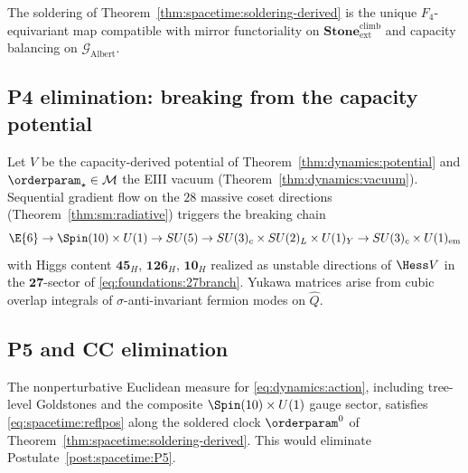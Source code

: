 \begin{conjecture}
\label{conj:spacetime:soldering-unique}
The soldering of Theorem~\ref{thm:spacetime:soldering-derived} is the unique
$F_4$-equivariant map compatible with mirror functoriality on
$\mathbf{Stone}^{\mathrm{climb}}_{\mathrm{ext}}$ and capacity balancing on
$\mathcal{G}_{\mathrm{Albert}}$.
\end{conjecture}

\subsection{P4 elimination: breaking from the capacity potential}
\label{sec:axiomatic:p4}

\begin{conjecture}
\label{conj:sm:breaking-derived}
Let $V$ be the capacity-derived potential of Theorem~\ref{thm:dynamics:potential}
and $\orderparam_\star\in\mathcal{M}$ the EIII vacuum
(Theorem~\ref{thm:dynamics:vacuum}). Sequential gradient flow on the $28$
massive coset directions (Theorem~\ref{thm:sm:radiative}) triggers the breaking
chain
\[
  \E{6}\to\Spin(10)\times U(1)\to SU(5)\to SU(3)_c\times SU(2)_L\times U(1)_Y
  \to SU(3)_c\times U(1)_{\mathrm{em}}
\]
with Higgs content $\mathbf{45}_H$, $\mathbf{126}_H$, $\mathbf{10}_H$ realized
as unstable directions of $\Hess V$ in the $\mathbf{27}$-sector of
\eqref{eq:foundations:27branch}. Yukawa matrices arise from cubic overlap
integrals of $\sigma$-anti-invariant fermion modes on $\hat Q$.
\end{conjecture}

\subsection{P5 and CC elimination}
\label{sec:axiomatic:p5cc}

\begin{conjecture}
\label{conj:spacetime:rp-full}
The nonperturbative Euclidean measure for \eqref{eq:dynamics:action},
including tree-level Goldstones and the composite $\Spin(10)\times U(1)$ gauge
sector, satisfies \eqref{eq:spacetime:reflpos} along the soldered clock
$\orderparam^0$ of Theorem~\ref{thm:spacetime:soldering-derived}. This would
eliminate Postulate~\ref{post:spacetime:P5}.
\end{conjecture}

